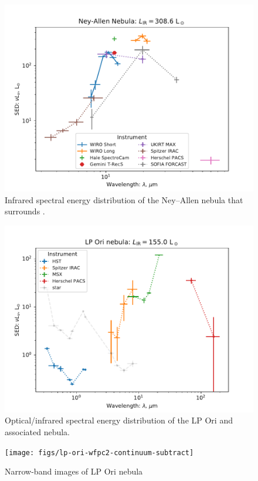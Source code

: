 \begin{figure}
  \centering
  \includegraphics[width=\linewidth]{figs/ney-allen-sed}
  \caption{Infrared spectral energy distribution of the Ney--Allen
    nebula that surrounds \thD. }
  \label{fig:ney-allen-sed}
\end{figure}


\begin{figure}
  \centering
  \includegraphics[width=\linewidth]{figs/lp-ori-sed}
  \caption{Optical/infrared spectral energy distribution of the LP Ori
    and associated nebula. }
  \label{fig:lp-ori-sed}
\end{figure}

\begin{figure}
  \centering
  \texttt{[image: figs/lp-ori-wfpc2-continuum-subtract]}
  \caption{Narrow-band images of LP Ori nebula }
  \label{fig:lp-ori-sed}
\end{figure}



